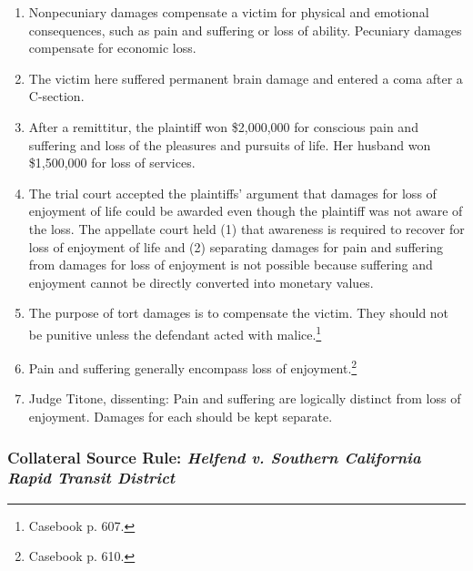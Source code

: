 \begin{enumerate}
    \item Nonpecuniary damages compensate a victim for physical and emotional 
    consequences, such as pain and suffering or loss of ability. Pecuniary 
    damages compensate for economic loss.
    \item The victim here suffered permanent brain damage and entered a coma 
    after a C-section.
    \item After a remittitur, the plaintiff won \$2,000,000 for conscious pain 
    and suffering and loss of the pleasures and pursuits of life. Her husband 
    won \$1,500,000 for loss of services.
    \item The trial court accepted the plaintiffs' argument that damages for 
    loss of enjoyment of life could be awarded even though the plaintiff was not 
    aware of the loss. The appellate court held (1) that awareness is required 
    to recover for loss of enjoyment of life and (2) separating damages for pain 
    and suffering from damages for loss of enjoyment is not possible because 
    suffering and enjoyment cannot be directly converted into monetary values.
    \item The purpose of tort damages is to compensate the victim. They should 
    not be punitive unless the defendant acted with malice.\footnote{Casebook p. 
    607.}
    \item Pain and suffering generally encompass loss of 
    enjoyment.\footnote{Casebook p. 610.}
    \item Judge Titone, dissenting: Pain and suffering are logically distinct 
    from loss of enjoyment. Damages for each should be kept separate.
\end{enumerate}

\subsubsection{Collateral Source Rule: \emph{Helfend v. Southern California 
Rapid Transit District}}

